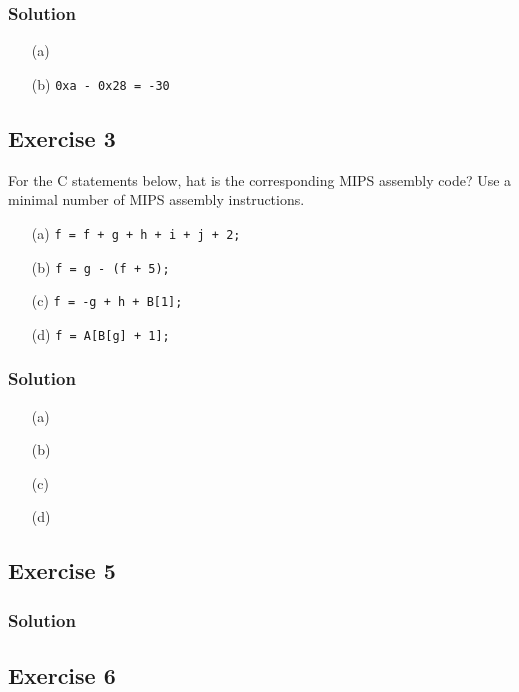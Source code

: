 \documentclass[12pt]{article}
\begin{document}
\subsubsection*{Solution}
\begin{itemize}
\item[(a)] 
\item[(b)] {\tt 0xa - 0x28 = -30}
\end{itemize}

\subsection*{Exercise 3}
For the C statements below, hat is the corresponding MIPS assembly code? Use a minimal number of MIPS assembly instructions.
\begin{itemize}
\item[(a)] {\tt f = f + g + h + i + j + 2;}
\item[(b)] {\tt f = g - (f + 5);}
\item[(c)] {\tt f = -g + h + B[1];}
\item[(d)] {\tt f = A[B[g] + 1];}
\end{itemize}
\subsubsection*{Solution}
\begin{itemize}
\item[(a)] 

\item[(b)] 

\item[(c)] 

\item[(d)] 
\end{itemize}

\subsection*{Exercise 5}
\subsubsection*{Solution}


\subsection*{Exercise 6}
\end{document}
